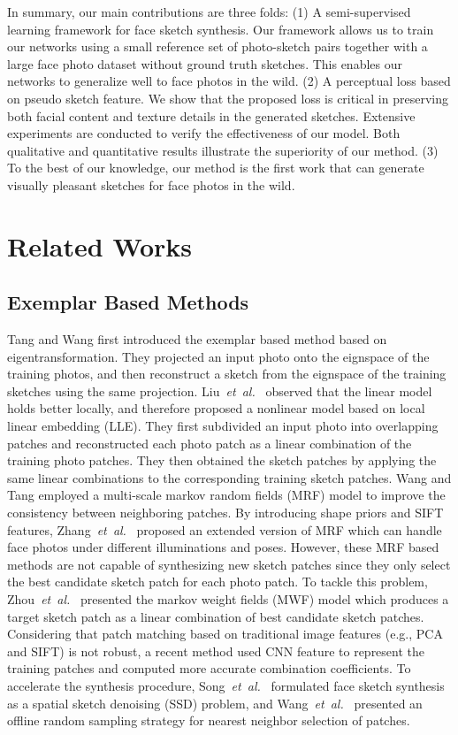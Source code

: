\documentclass[runningheads]{llncs}
\def \etal {{\em et~al.}}
\begin{document}
In summary, our main contributions are three folds: (1) A semi-supervised learning framework for face sketch synthesis. Our framework allows us to train our networks using a small reference set of photo-sketch pairs together with a large face photo dataset without ground truth sketches. This enables our networks to generalize well to face photos in the wild. (2) A perceptual loss based on pseudo sketch feature. We show that the proposed loss is critical in preserving both facial content and texture details in the generated sketches. Extensive experiments are conducted to verify the effectiveness of our model. Both qualitative and quantitative results illustrate the superiority of our method. (3) To the best of our knowledge, our method is the first work that can generate visually pleasant sketches for face photos in the wild.

\section{Related Works}

\subsection{Exemplar Based Methods}

Tang and Wang \cite{tang2003face} first introduced the exemplar based method based on eigentransformation. They projected an input photo onto the eignspace of the training photos, and then reconstruct a sketch from the eignspace of the training sketches using the same projection. Liu~\etal~\cite{liu2005nonlinear} observed that the linear model holds better locally, and therefore proposed a nonlinear model based on local linear embedding (LLE). They first subdivided an input photo into overlapping patches and reconstructed each photo patch as a linear combination of the training photo patches. They then obtained the sketch patches by applying the same linear combinations to the corresponding training sketch patches. Wang and Tang \cite{wang2009face} employed a multi-scale markov random fields (MRF) model to improve the consistency between neighboring patches. By introducing shape priors and SIFT features, Zhang~\etal~\cite{zhang2010lighting} proposed an extended version of MRF which can handle face photos under different illuminations and poses. However, these MRF based methods are not capable of synthesizing new sketch patches since they only select the best candidate sketch patch for each photo patch. To tackle this problem, Zhou~\etal~\cite{zhou2012markov} presented the markov weight fields (MWF) model which produces a target sketch patch as a linear combination of   best candidate sketch patches. Considering that patch matching based on traditional image features (e.g., PCA and SIFT) is not robust, a recent method \cite{ijcai2017-500} used CNN feature to represent the training patches and computed more accurate combination coefficients. To accelerate the synthesis procedure, Song~\etal~\cite{song2014real} formulated face sketch synthesis as a spatial sketch denoising (SSD) problem, and Wang~\etal~\cite{wangrslcr} presented an offline random sampling strategy for nearest neighbor selection of patches.
\end{document}
